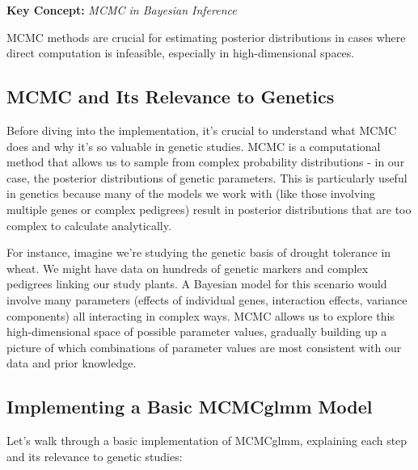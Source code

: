 \documentclass[12pt,a4paper]{article}
\newenvironment{keyconceptbox}[1][]
{\begin{basebox}[linecolor=uqblue]
\textbf{\color{uqblue}Key Concept:} \textit{#1}\par\noindent\ignorespaces}
{\end{basebox}}
\begin{document}
\begin{keyconceptbox}[MCMC in Bayesian Inference]
MCMC methods are crucial for estimating posterior distributions in cases where direct computation is infeasible, especially in high-dimensional spaces.
\end{keyconceptbox}

\subsection{MCMC and Its Relevance to Genetics}

Before diving into the implementation, it's crucial to understand what MCMC does and why it's so valuable in genetic studies. MCMC is a computational method that allows us to sample from complex probability distributions - in our case, the posterior distributions of genetic parameters. This is particularly useful in genetics because many of the models we work with (like those involving multiple genes or complex pedigrees) result in posterior distributions that are too complex to calculate analytically.

For instance, imagine we're studying the genetic basis of drought tolerance in wheat. We might have data on hundreds of genetic markers and complex pedigrees linking our study plants. A Bayesian model for this scenario would involve many parameters (effects of individual genes, interaction effects, variance components) all interacting in complex ways. MCMC allows us to explore this high-dimensional space of possible parameter values, gradually building up a picture of which combinations of parameter values are most consistent with our data and prior knowledge.

\subsection{Implementing a Basic MCMCglmm Model}

Let's walk through a basic implementation of MCMCglmm, explaining each step and its relevance to genetic studies:
\end{document}

